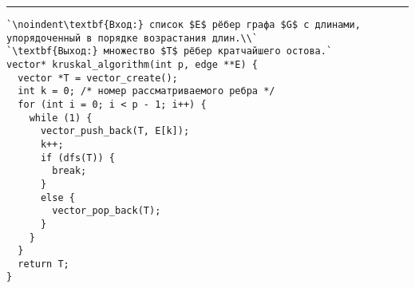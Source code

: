 \vspace{5pt} \hrule
\begin{lstlisting}[caption={Алгоритм Краскала}, label=p329_kruskal, escapechar=`]
`\noindent\textbf{Вход:} список $E$ рёбер графа $G$ с длинами, упорядоченный в порядке возрастания длин.\\`
`\textbf{Выход:} множество $T$ рёбер кратчайшего остова.`
vector* kruskal_algorithm(int p, edge **E) {
  vector *T = vector_create();
  int k = 0; /* номер рассматриваемого ребра */
  for (int i = 0; i < p - 1; i++) {
    while (1) {
      vector_push_back(T, E[k]);
      k++;
      if (dfs(T)) {
        break;
      }
      else {
        vector_pop_back(T);
      }
    }
  }
  return T;
}
\end{lstlisting}
